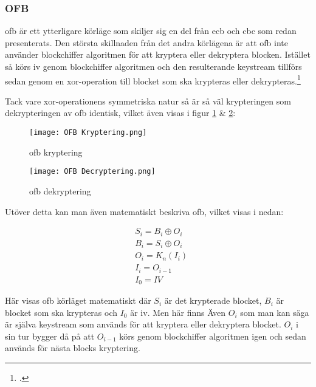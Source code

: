 \subsubsection{OFB}
\label{sec:ofb}
\acrlong{ofb} är ett ytterligare körläge som skiljer sig en del från \acrshort{ecb}
och \acrshort{cbc} som  redan presenterats. Den största skillnaden från det andra
körlägena är att \acrshort{ofb} inte använder blockchiffer algoritmen för att kryptera
eller dekryptera blocken. Istället så körs \acrshort{iv} genom blockchiffer algoritmen
och den resulterande \gls{keystream} tillförs sedan genom en \gls{xor}-operation till
blocket som ska krypteras eller dekrypteras.\footcite{dworkin2001sp}

Tack vare \gls{xor}-operationens symmetriska natur så är så väl krypteringen som
dekrypteringen av \acrshort{ofb} identisk, vilket även visas i figur \ref{fig:ofb-mode-enc}
\& \ref{fig:ofb-mode-dec}:

\begin{figure}[H]
    \texttt{[image: OFB Kryptering.png]}
    \caption{\acrlong{ofb} kryptering}
    \label{fig:ofb-mode-enc}
\end{figure}

\begin{figure}[H]
    \texttt{[image: OFB Decryptering.png]}
    \caption{\acrlong{ofb} dekryptering}
    \label{fig:ofb-mode-dec}
\end{figure}

Utöver detta kan man även matematiskt beskriva \acrshort{ofb}, vilket visas i nedan:

\begin{equation}
    \label{eq:ofb-encryption}
    \begin{aligned}
        &S_i = B_i \oplus O_i\\\nonumber
        &B_i = S_i \oplus O_i\\
        &O_i = K_n(I_i)\\
        &I_i = O_{i-1}\\
        &I_0 = IV
    \end{aligned}
\end{equation}

Här visas \acrshort{ofb} körläget matematiskt där $S_i$ är det krypterade blocket,
$B_i$ är blocket som ska krypteras och $I_0$ är \acrshort{iv}. Men här finns Även
$O_i$ som man kan säga är själva \gls{keystream} som används för att kryptera eller
dekryptera blocket. $O_i$ i sin tur bygger då på att $O_{i-1}$ körs genom blockchiffer
algoritmen igen och sedan används för nästa blocks kryptering.


